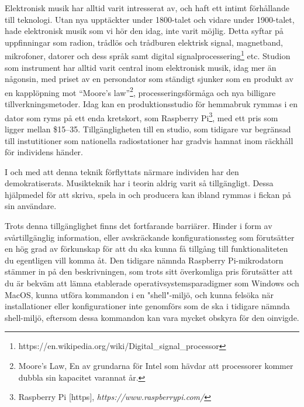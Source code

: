 \documentclass{article}
\begin{document}
Elektronisk musik har alltid varit intresserat av, och haft ett intimt förhållande till teknologi. Utan nya
upptäckter under 1800-talet och vidare under 1900-talet, hade elektronisk musik som vi hör den idag, inte
varit möjlig. Detta syftar på uppfinningar som radion, trådlös och trådburen elektrisk signal, magnetband,
mikrofoner, datorer och dess språk samt digital
signalprocessering\footnote{https://en.wikipedia.org/wiki/Digital\_signal\_processor} etc. Studion som instrument
har alltid varit central inom elektronisk musik, idag mer än någonsin, med
priset av en persondator som ständigt sjunker som en produkt av en kapplöpning mot ``Moore's
law''\footnote{Moore's Law, En av grundarna för Intel som hävdar att processorer kommer dubbla sin kapacitet
varannat år.}, processeringsförmåga och nya billigare tillverkningsmetoder. Idag kan en produktionsstudio för
hemmabruk rymmas i en dator som ryms på ett enda kretskort, som Raspberry Pi\footnote{Raspberry Pi [https],
\emph{https://www.raspberrypi.com/}}, med ett pris som ligger mellan \$15–35. Tillgängligheten till en studio,
som tidigare var begränsad till instutitioner som nationella radiostationer har gradvis hamnat inom räckhåll
för individens händer.

I och med att denna teknik förflyttats närmare individen har den demokratiserats. Musikteknik har i teorin
aldrig varit så tillgängligt. Dessa hjälpmedel för att skriva, spela in och producera kan ibland rymmas i
fickan på sin användare.

Trots denna tillgänglighet finns det fortfarande barriärer. Hinder i form av svårtillgänglig information,
eller avskräckande konfigurationssteg som förutsätter en hög grad av förkunskap för att du ska kunna få
tillgång till funktionaliteten du egentligen vill komma åt. Den tidigare nämnda
Raspberry Pi-mikrodatorn stämmer in på den beskrivningen, som trots sitt överkomliga pris förutsätter att du
är bekväm att lämna etablerade operativsystemsparadigmer som Windows och MacOS, kunna utföra kommandon i en
"shell"-miljö, och kunna felsöka när installationer eller konfigurationer inte genomförs som de ska i tidigare
nämnda shell-miljö, eftersom dessa kommandon kan vara mycket obskyra för den oinvigde.
	
\end{document}
